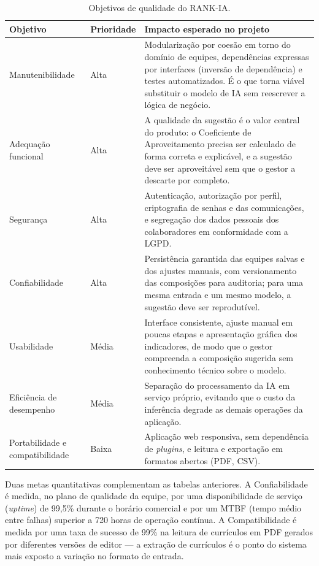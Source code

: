 \documentclass[a4paper,12pt,oneside,openany]{book}
\begin{document}
\begin{table}[H]
\centering
\caption{Objetivos de qualidade do RANK-IA.}
\label{tab:quality-goals}
\begin{tabularx}{0.95\textwidth}{p{} p{} X}
\toprule
\textbf{Objetivo} & \textbf{Prioridade} & \textbf{Impacto esperado no projeto} \\
\midrule
Manutenibilidade & Alta & Modularização por coesão em torno do domínio de
equipes, dependências expressas por interfaces (inversão de dependência) e
testes automatizados. É o que torna viável substituir o modelo de IA sem
reescrever a lógica de negócio. \\
Adequação funcional & Alta & A qualidade da sugestão é o valor central do
produto: o Coeficiente de Aproveitamento precisa ser calculado de forma correta e
explicável, e a sugestão deve ser aproveitável sem que o gestor a descarte por
completo. \\
Segurança & Alta & Autenticação, autorização por perfil, criptografia de senhas e
das comunicações, e segregação dos dados pessoais dos colaboradores em
conformidade com a LGPD. \\
Confiabilidade & Alta & Persistência garantida das equipes salvas e dos ajustes
manuais, com versionamento das composições para auditoria; para uma mesma
entrada e um mesmo modelo, a sugestão deve ser reprodutível. \\
Usabilidade & Média & Interface consistente, ajuste manual em poucas etapas e
apresentação gráfica dos indicadores, de modo que o gestor compreenda a
composição sugerida sem conhecimento técnico sobre o modelo. \\
Eficiência de desempenho & Média & Separação do processamento da IA em serviço
próprio, evitando que o custo da inferência degrade as demais operações da
aplicação. \\
Portabilidade e compatibilidade & Baixa & Aplicação web responsiva, sem
dependência de \textit{plugins}, e leitura e exportação em formatos abertos
(PDF, CSV). \\
\bottomrule
\end{tabularx}
\end{table}

Duas metas quantitativas complementam as tabelas anteriores. A Confiabilidade
é medida, no plano de qualidade da equipe, por uma disponibilidade de serviço
(\textit{uptime}) de 99,5\% durante o horário comercial e por um MTBF (tempo
médio entre falhas) superior a 720 horas de operação contínua. A
Compatibilidade é medida por uma taxa de sucesso de 99\% na leitura de
currículos em PDF gerados por diferentes versões de editor --- a extração de
currículos é o ponto do sistema mais exposto a variação no formato de entrada.
\end{document}
